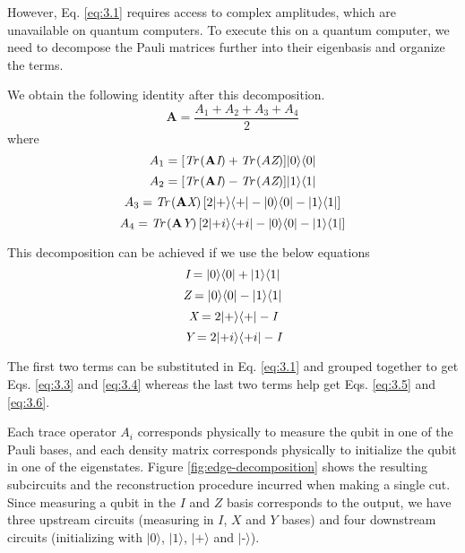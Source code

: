 However, Eq. \ref{eq:3.1} requires access to complex amplitudes, which are unavailable on quantum computers. To execute this on a quantum computer, we need to decompose the Pauli matrices further into their eigenbasis and organize the terms.  

We obtain the following identity after this decomposition.
\begin{equation} \label{eq:3.2}
    \textbf{A} = \frac{A_1 + A_2 + A_3 + A_4}{2}
\end{equation}
where
\begin{equation} \label{eq:3.3}
    A_1 = [ \emph{Tr} \left( \textbf{A} \emph{I} \right) + \emph{Tr} \left( A\emph{Z} \right) ] |0\rangle\langle0|
\end{equation}
\begin{equation} \label{eq:3.4}
    A_2 = [ \emph{Tr} \left( \textbf{A} \emph{I} \right) - \emph{Tr} \left( A\emph{Z} \right) ] |1\rangle\langle1|
\end{equation}
\begin{equation} \label{eq:3.5}
    A_3 = \emph{Tr} \left( \textbf{A} \emph{X} \right) [ 2 |\text{+}\rangle\langle\text{+}| - |0\rangle\langle0| - |1\rangle\langle1| ]
\end{equation}
\begin{equation} \label{eq:3.6}
    A_4 = \emph{Tr} \left( \textbf{A} \emph{Y} \right) [ 2 |\text{+}i\rangle\langle\text{+}i| - |0\rangle\langle0| - |1\rangle\langle1| ]
\end{equation}


\noindent This decomposition can be achieved if we use the below equations
$$ \emph{I} = |0\rangle\langle0| + |1\rangle\langle1| $$
$$ \emph{Z} = |0\rangle\langle0| - |1\rangle\langle1| $$
$$ \emph{X} = 2 |\text{+}\rangle\langle\text{+}| - \emph{I} $$
$$ \emph{Y} = 2 |\text{+}i\rangle\langle\text{+}i| - \emph{I} $$

\noindent The first two terms can be substituted in Eq. \ref{eq:3.1} and grouped together to get Eqs. \ref{eq:3.3} and \ref{eq:3.4} whereas the last two terms help get Eqs. \ref{eq:3.5} and \ref{eq:3.6}.

Each trace operator $A_{i}$ corresponds physically to measure the qubit in one of the Pauli bases, and each density matrix corresponds physically to initialize the qubit in one of the eigenstates. Figure \ref{fig:edge-decomposition} shows the resulting subcircuits and the reconstruction procedure incurred when making a single cut. Since measuring a qubit in the $I$ and $Z$ basis corresponds to the output, we have three upstream circuits (measuring in $I$, $X$ and $Y$ bases) and four downstream circuits (initializing with $|\text{0}\rangle$, $|\text{1}\rangle$, $|\text{+}\rangle$ and $|\text{-}\rangle$).

